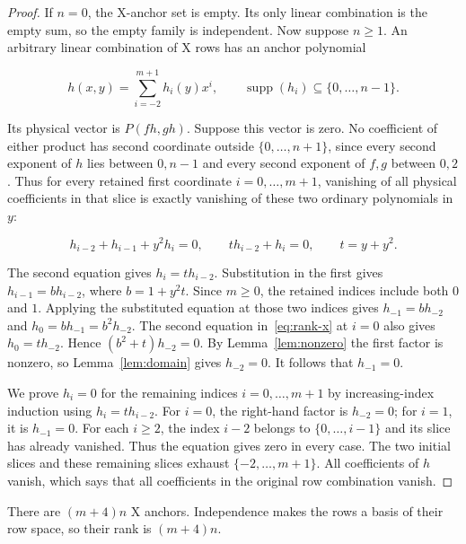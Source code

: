 \documentclass{article}
\begin{document}
\begin{proof}
If \(n=0\), the X-anchor set is empty. Its only linear
combination is the empty sum, so the empty family is independent. Now
suppose \(n\ge 1\). An arbitrary linear combination of X rows has an
anchor polynomial

\begin{equation}
 h(x,y)=\sum_{i=-2}^{m+1} h_i(y)x^i,
 \qquad \operatorname{supp}(h_i)\subseteq\{0,\ldots,n-1\}.
\end{equation}

Its physical vector is \(P(fh,gh)\). Suppose this vector is zero. No
coefficient of either product has second coordinate outside
\(\{0,\ldots ,n+1\}\), since every second exponent of \(h\) lies between
\(0,n-1\) and every second exponent of \(f,g\) between \(0,2\). Thus for
every retained first coordinate \(i=0,\ldots ,m+1\), vanishing of all
physical coefficients in that slice is exactly vanishing of these two
ordinary polynomials in \(y\):

\begin{equation}
 h_{i-2}+h_{i-1}+y^2h_i=0,
 \qquad t h_{i-2}+h_i=0,
 \qquad t=y+y^2.\label{eq:rank-x}
\end{equation}

The second equation gives \(h_i=t h_{i-2}\). Substitution in the first
gives \(h_{i-1}=b h_{i-2}\), where \(b=1+y^2t\). Since \(m\ge 0\), the
retained indices include both \(0\) and \(1\). Applying the substituted
equation at those two indices gives \(h_{-1}=b h_{-2}\) and
\(h_0=b h_{-1}=b^2h_{-2}\). The second equation in~\eqref{eq:rank-x} at \(i=0\) also
gives \(h_0=t h_{-2}\). Hence \((b^2+t)h_{-2}=0\). By Lemma~\ref{lem:nonzero} the first
factor is nonzero, so Lemma~\ref{lem:domain} gives \(h_{-2}=0\). It follows that
\(h_{-1}=0\).

We prove \(h_i=0\) for the remaining indices \(i=0,\ldots ,m+1\) by
increasing-index induction using \(h_i=t h_{i-2}\). For \(i=0\), the
right-hand factor is \(h_{-2}=0\); for \(i=1\), it is \(h_{-1}=0\). For
each \(i\ge 2\), the index \(i-2\) belongs to \(\{0,\ldots ,i-1\}\) and
its slice has already vanished. Thus the equation gives zero in every
case. The two initial slices and these remaining slices exhaust
\(\{-2,\ldots ,m+1\}\). All coefficients of \(h\) vanish, which says
that all coefficients in the original row combination vanish.
\end{proof}

There are \((m+4)n\) X anchors. Independence makes the rows a basis of
their row space, so their rank is \((m+4)n\).
\end{document}
